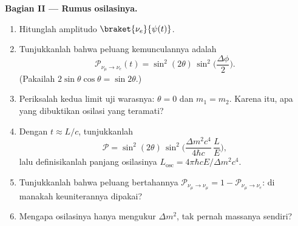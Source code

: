 \begin{problem}
\medskip\noindent\textbf{Bagian II --- Rumus osilasinya.}
\begin{enumerate}[resume]
  \item Hitunglah amplitudo $\braket{\nu_e}{\psi(t)}$.
  \item Tunjukkanlah bahwa peluang kemunculannya adalah
        \[
        \mathcal P_{\nu_\mu \to \nu_e}(t) =
        \sin^2(2\theta)\,\sin^2\Big(\frac{\Delta\phi}{2}\Big) .
        \]
        (Pakailah $2\sin\theta\cos\theta = \sin2\theta$.)
  \item Periksalah kedua limit uji warasnya: $\theta = 0$ dan $m_1 = m_2$.
        Karena itu, apa yang dibuktikan osilasi yang teramati?
  \item Dengan $t \approx L/c$, tunjukkanlah
        \[
        \mathcal P = \sin^2(2\theta)\,
        \sin^2\Big(\frac{\Delta m^2c^4}{4\hbar c}\,\frac{L}{E}\Big) ,
        \]
        lalu definisikanlah panjang osilasinya $L_{\text{osc}} =
        4\pi\hbar cE/\Delta m^2c^4$.
  \item Tunjukkanlah bahwa peluang bertahannya $\mathcal P_{\nu_\mu \to
        \nu_\mu} = 1 - \mathcal P_{\nu_\mu\to\nu_e}$: di manakah
        keuniterannya dipakai?
  \item Mengapa osilasinya hanya mengukur $\Delta m^2$, tak pernah
        massanya sendiri?
\end{enumerate}


\end{problem}
